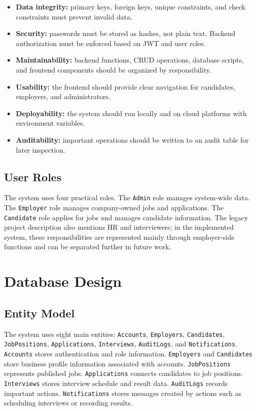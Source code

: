 \documentclass[12pt,a4paper]{report}
\begin{document}
\begin{itemize}[leftmargin=1.5cm]
  \item \textbf{Data integrity:} primary keys, foreign keys, unique constraints, and check constraints must prevent invalid data.
  \item \textbf{Security:} passwords must be stored as hashes, not plain text. Backend authorization must be enforced based on JWT and user roles.
  \item \textbf{Maintainability:} backend functions, CRUD operations, database scripts, and frontend components should be organized by responsibility.
  \item \textbf{Usability:} the frontend should provide clear navigation for candidates, employers, and administrators.
  \item \textbf{Deployability:} the system should run locally and on cloud platforms with environment variables.
  \item \textbf{Auditability:} important operations should be written to an audit table for later inspection.
\end{itemize}

\section{User Roles}

The system uses four practical roles. The \texttt{Admin} role manages system-wide data. The \texttt{Employer} role manages company-owned jobs and applications. The \texttt{Candidate} role applies for jobs and manages candidate information. The legacy project description also mentions HR and interviewers; in the implemented system, these responsibilities are represented mainly through employer-side functions and can be separated further in future work.

\chapter{Database Design}

\section{Entity Model}

The system uses eight main entities: \texttt{Accounts}, \texttt{Employers}, \texttt{Candidates}, \texttt{JobPositions}, \texttt{Applications}, \texttt{Interviews}, \texttt{AuditLogs}, and \texttt{Notifications}. \texttt{Accounts} stores authentication and role information. \texttt{Employers} and \texttt{Candidates} store business profile information associated with accounts. \texttt{JobPositions} represents published jobs. \texttt{Applications} connects candidates to job positions. \texttt{Interviews} stores interview schedule and result data. \texttt{AuditLogs} records important actions. \texttt{Notifications} stores messages created by actions such as scheduling interviews or recording results.
\end{document}
